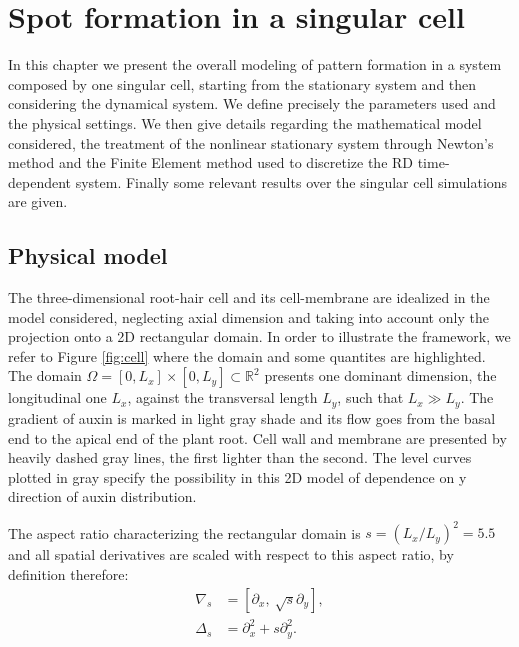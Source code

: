 \chapter{Spot formation in a singular cell}\label{cap:2}
In this chapter we present the overall modeling of pattern formation in a system composed by one singular cell, starting from the stationary system and then considering the dynamical system. We define precisely the parameters used and the physical settings. We then give details regarding the mathematical model considered, the treatment of the nonlinear stationary system through Newton's method and the Finite Element method used to discretize the RD time-dependent system. Finally some relevant results over the singular cell simulations are given.

\section{Physical model}
The three-dimensional root-hair cell and its cell-membrane are idealized in the model considered, neglecting axial dimension and taking into account only the projection onto a 2D rectangular domain. In order to illustrate the framework, we refer to Figure \ref{fig:cell} where the domain and some quantites are highlighted. The domain $\Omega  = \left[0,L_x\right] \times \left[0,L_y\right] \subset \mathds{R}^2$ presents one dominant dimension, the longitudinal one $L_x$, against the transversal length $L_y$, such that $L_x \gg L_y$. The gradient of auxin is marked in light gray shade and its flow goes from the basal end to the apical end of the plant root. Cell wall and membrane are presented by heavily dashed gray lines, the first lighter than the second. The level curves plotted in gray specify the possibility in this 2D model of dependence on y direction of auxin distribution.

The aspect ratio characterizing the rectangular domain is $s = \left(L_x / L_y \right)^2 = 5.5$ and all spatial derivatives are scaled with respect to this aspect ratio, by definition therefore:
\begin{equation*} \begin{aligned}
    \nabla_s & = \left[\partial_x  , \ \sqrt{s}\partial_y \right], \\
    \Delta_s & = \partial_x^2 + s \partial_y^2.
\end{aligned} \end{equation*}

